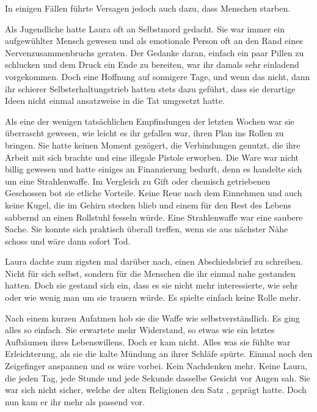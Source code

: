 \par

In einigen Fällen führte Versagen jedoch auch dazu, dass Menschen starben.

\par

Als Jugendliche hatte Laura oft an Selbstmord gedacht.
Sie war immer ein aufgewühlter Mensch gewesen und als emotionale Person oft an den Rand eines Nervenzusammenbruchs geraten.
Der Gedanke daran, einfach ein paar Pillen zu schlucken und dem Druck ein Ende zu bereiten, war ihr damals sehr einladend vorgekommen.
Doch eine Hoffnung auf sonnigere Tage, und wenn das nicht, dann ihr schierer Selbsterhaltungstrieb hatten stets dazu geführt, dass sie derartige Ideen nicht einmal ansatzweise in die Tat umgesetzt hatte.

\par

Als eine der wenigen tatsächlichen Empfindungen der letzten Wochen war sie überrascht gewesen, wie leicht es ihr gefallen war, ihren Plan ins Rollen zu bringen.
Sie hatte keinen Moment gezögert, die Verbindungen genutzt, die ihre Arbeit mit sich brachte und eine illegale Pistole erworben.
Die Ware war nicht billig gewesen und hatte einiges an Finanzierung bedurft, denn es handelte sich um eine Strahlenwaffe.
Im Vergleich zu Gift oder chemisch getriebenen Geschossen bot sie etliche Vorteile.
Keine Reue nach dem Einnehmen und auch keine Kugel, die im Gehirn stecken blieb und einem für den Rest des Lebens sabbernd an einen Rollstuhl fesseln würde.
Eine Strahlenwaffe war eine saubere Sache.
Sie konnte sich praktisch überall treffen, wenn sie aus nächster Nähe schoss und wäre dann sofort Tod.

\par

Laura dachte zum zigsten mal darüber nach, einen Abschiedsbrief zu schreiben.
Nicht für sich selbst, sondern für die Menschen die ihr einmal nahe gestanden hatten.
Doch sie gestand sich ein, dass es sie nicht mehr interessierte, wie sehr oder wie wenig man um sie trauern würde.
Es spielte einfach keine Rolle mehr.

\par

Nach einem kurzen Aufatmen hob sie die Waffe wie selbstverständlich.
Es ging alles so einfach.
Sie erwartete mehr Widerstand, so etwas wie ein letztes Aufbäumen ihres Lebenswillens.
Doch er kam nicht.
Alles was sie fühlte war Erleichterung, als sie die kalte Mündung an ihrer Schläfe spürte.
Einmal noch den Zeigefinger anspannen und es wäre vorbei.
Kein Nachdenken mehr.
Keine Laura, die jeden Tag, jede Stunde und jede Sekunde dasselbe Gesicht vor Augen sah.
Sie war sich nicht sicher, welche der alten Religionen den Satz , geprägt hatte.
Doch nun kam er ihr mehr als passend vor.

